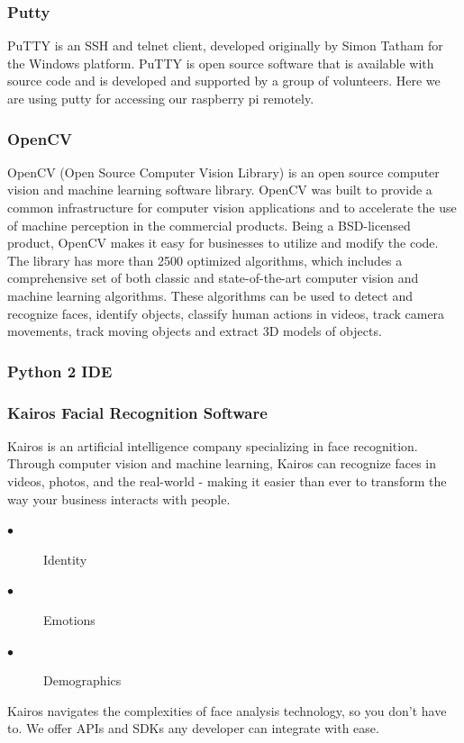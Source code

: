 \documentclass[sigconf]{acmart}
\begin{document}
\subsubsection{Putty}
PuTTY is an SSH and telnet client, developed originally by Simon Tatham for the Windows platform. PuTTY is open source software that is available with source code and is developed and supported by a group of volunteers. Here we are using putty for accessing our raspberry pi remotely.

\subsubsection{OpenCV}
OpenCV (Open Source Computer Vision Library) is an open source computer vision and machine learning software library. OpenCV was built to provide a common infrastructure for computer vision applications and to accelerate the use of machine perception in the commercial products. Being a BSD-licensed product, OpenCV makes it easy for businesses to utilize and modify the code. The library has more than 2500 optimized algorithms, which includes a comprehensive set of both classic and state-of-the-art computer vision and machine learning algorithms. These algorithms can be used to detect and recognize faces, identify objects, classify human actions in videos, track camera movements, track moving objects and extract 3D models of objects.

\subsubsection{Python 2 IDE}

\subsubsection{Kairos Facial Recognition Software}
Kairos is an artificial intelligence company specializing in face recognition. Through computer vision and machine learning, Kairos can recognize faces in videos, photos, and the real-world - making it easier than ever to transform the way your business interacts with people.
\begin{description}
  \item[$\bullet$] Identity 
  \item[$\bullet$] Emotions 
  \item[$\bullet$] Demographics
\end{description}
Kairos navigates the complexities of face analysis technology, so you don’t have to. We offer APIs and SDKs any developer can integrate with ease.
\end{document}

